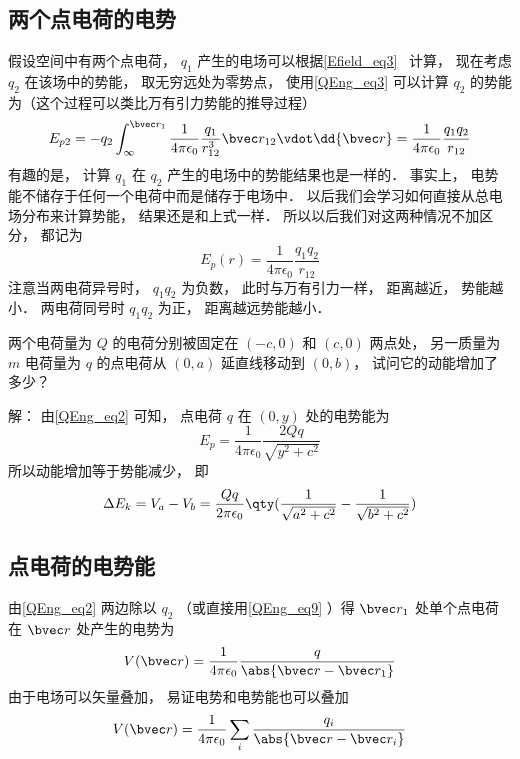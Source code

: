 \subsection{两个点电荷的电势}
假设空间中有两个点电荷， $q_1$ 产生的电场可以根据\autoref{Efield_eq3}~ 计算， 现在考虑 $q_2$ 在该场中的势能， 取无穷远处为零势点， 使用\autoref{QEng_eq3} 可以计算 $q_2$ 的势能为（这个过程可以类比万有引力势能的推导过程）
\begin{equation}
E_{p2} = -q_2 \int_{\infty}^{\bvec r_1} \frac{1}{4\pi\epsilon_0} \frac{q_1}{r_{12}^3}\bvec r_{12} \vdot \dd{\bvec r}
= \frac{1}{4\pi\epsilon_0} \frac{q_1 q_2}{r_{12}}
\end{equation}
有趣的是， 计算 $q_1$ 在 $q_2$ 产生的电场中的势能结果也是一样的． 事实上， 电势能不储存于任何一个电荷中而是储存于电场中． 以后我们会学习如何直接从总电场分布来计算势能， 结果还是和上式一样． %
所以以后我们对这两种情况不加区分， 都记为
\begin{equation}\label{QEng_eq2}
E_p(r) = \frac{1}{4\pi\epsilon_0} \frac{q_1 q_2}{r_{12}}
\end{equation}
注意当两电荷异号时， $q_1 q_2$ 为负数， 此时与万有引力一样， 距离越近， 势能越小． 两电荷同号时 $q_1 q_2$ 为正， 距离越远势能越小．

\begin{example}{}
两个电荷量为 $Q$ 的电荷分别被固定在 $(-c, 0)$ 和 $(c, 0)$ 两点处， 另一质量为 $m$ 电荷量为 $q$ 的点电荷从 $(0, a)$ 延直线移动到 $(0, b)$， 试问它的动能增加了多少？

解： 由\autoref{QEng_eq2} 可知， 点电荷 $q$ 在 $(0, y)$ 处的电势能为
\begin{equation}
E_p = \frac{1}{4\pi\epsilon_0}\frac{2Qq}{\sqrt{y^2 + c^2}}
\end{equation}
所以动能增加等于势能减少， 即
\begin{equation}
\Delta E_k = V_a - V_b = \frac{Qq}{2\pi\epsilon_0}  \qty(\frac{1}{\sqrt{a^2 + c^2}} - \frac{1}{\sqrt{b^2 + c^2}})
\end{equation}
\end{example}

\subsection{点电荷的电势能}
由\autoref{QEng_eq2} 两边除以 $q_2$ （或直接用\autoref{QEng_eq9} ）得 $\bvec r_1$ 处单个点电荷在 $\bvec r$ 处产生的电势为
\begin{equation}
V(\bvec r) = \frac{1}{4\pi\epsilon_0} \frac{q}{\abs{\bvec r - \bvec r_1}}
\end{equation}
由于电场可以矢量叠加， 易证电势和电势能也可以叠加
\begin{equation}
V(\bvec r) = \frac{1}{4\pi\epsilon_0} \sum_i \frac{q_i}{\abs{\bvec r - \bvec r_i}}
\end{equation}

